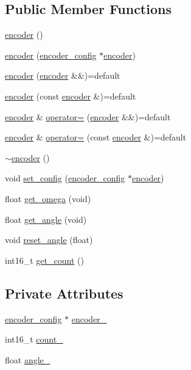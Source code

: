 \subsection*{Public Member Functions}
\begin{DoxyCompactItemize}
\item 
\mbox{\hyperlink{classencoder_af19dfa89c07692c0b1da8f24aec3d52d}{encoder}} ()
\item 
\mbox{\hyperlink{classencoder_a074f819c70398da9ce1af632dc391a19}{encoder}} (\mbox{\hyperlink{structencoder__config}{encoder\+\_\+config}} $\ast$\mbox{\hyperlink{classencoder}{encoder}})
\item 
\mbox{\hyperlink{classencoder_a612e51df8504a258ebab3f6cc296d0c4}{encoder}} (\mbox{\hyperlink{classencoder}{encoder}} \&\&)=default
\item 
\mbox{\hyperlink{classencoder_a6a9eb2f09a64535bc1105e415af90493}{encoder}} (const \mbox{\hyperlink{classencoder}{encoder}} \&)=default
\item 
\mbox{\hyperlink{classencoder}{encoder}} \& \mbox{\hyperlink{classencoder_a2e2784d15f3f7e13aecde2ead7a43a68}{operator=}} (\mbox{\hyperlink{classencoder}{encoder}} \&\&)=default
\item 
\mbox{\hyperlink{classencoder}{encoder}} \& \mbox{\hyperlink{classencoder_a9916948157fd30beeaf0fb141c356e2d}{operator=}} (const \mbox{\hyperlink{classencoder}{encoder}} \&)=default
\item 
\mbox{\hyperlink{classencoder_aa3b6033758cc93ea194c4b635c9547d6}{$\sim$encoder}} ()
\item 
void \mbox{\hyperlink{classencoder_afb36996f08db7f27e2df5334f90c8e53}{set\+\_\+config}} (\mbox{\hyperlink{structencoder__config}{encoder\+\_\+config}} $\ast$\mbox{\hyperlink{classencoder}{encoder}})
\item 
float \mbox{\hyperlink{classencoder_a9be6cc4f517fdc88970eb5d39e52f5c8}{get\+\_\+omega}} (void)
\item 
float \mbox{\hyperlink{classencoder_aba5b6ccdb374d7fcc5d9f2abab1a59da}{get\+\_\+angle}} (void)
\item 
void \mbox{\hyperlink{classencoder_af37dc5bf8a2323a500dd55f5fef12afb}{reset\+\_\+angle}} (float)
\item 
int16\+\_\+t \mbox{\hyperlink{classencoder_a51dc12e785ffd79f4c87e3533ae30434}{get\+\_\+count}} ()
\end{DoxyCompactItemize}
\subsection*{Private Attributes}
\begin{DoxyCompactItemize}
\item 
\mbox{\hyperlink{structencoder__config}{encoder\+\_\+config}} $\ast$ \mbox{\hyperlink{classencoder_aa59894d07cce9165245828c4e00c92e9}{encoder\+\_\+}}
\item 
int16\+\_\+t \mbox{\hyperlink{classencoder_a059f99828d5f0c5333f9d86e581db32d}{count\+\_\+}}
\item 
float \mbox{\hyperlink{classencoder_a1eaaad413fa84f01afad8db46bd8d4d3}{angle\+\_\+}}
\end{DoxyCompactItemize}


